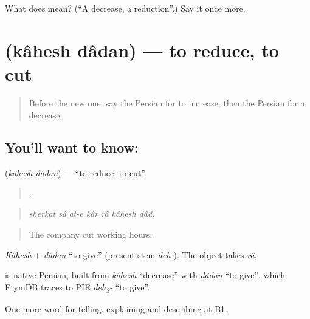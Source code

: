 \begin{tcolorbox}[breakable,colback=teal!4,colframe=teal!35!black,title={Before you move on}]
What does  mean? (\textquotedblleft{}A decrease, a reduction\textquotedblright{}.) Say it once more.
\end{tcolorbox}
\section[\texorpdfstring{\fa{کاهش} \fa{دادن} (kâhesh dâdan)}{کاهش دادن (kâhesh dâdan)}]{  (kâhesh dâdan) — to reduce, to cut}

\label{lesson:FA-C373-kahesh-dadan}



\begin{quote}
Before the new one: say the Persian for to increase, then the Persian for a decrease.
\end{quote}

\subsection*{You'll want to know:  }
\textbf{ } (\emph{kâhesh dâdan}) — \textquotedblleft{}to reduce, to cut\textquotedblright{}.

\begin{quote}
     .
\end{quote}

\begin{quote}
\emph{sherkat sâ'at-e kâr râ kâhesh dâd.}
\end{quote}

\begin{quote}
The company cut working hours.
\end{quote}

\emph{Kâhesh} + \emph{dâdan} \textquotedblleft{}to give\textquotedblright{} (present stem \emph{deh-}). The object takes \emph{râ}.

\begin{cousinweb}
\textbf{ } is native Persian, built from \emph{kâhesh} \textquotedblleft{}decrease\textquotedblright{} with \emph{dâdan} \textquotedblleft{}to give\textquotedblright{}, which EtymDB traces to PIE \emph{deh\textsubscript{3}-} \textquotedblleft{}to give\textquotedblright{}.
\end{cousinweb}

\begin{grammarlens}[title={What you've built}]
One more word for telling, explaining and describing at B1.
\end{grammarlens}

